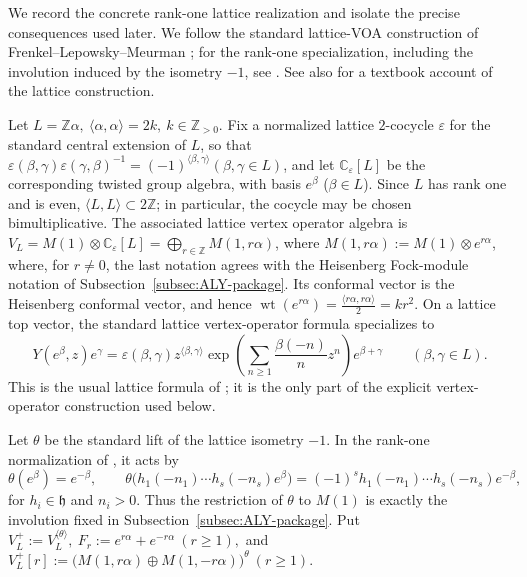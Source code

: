 \documentclass[10pt,a4paper]{amsart}
\numberwithin{equation}{section} \newtheorem{thm}{Theorem}[section] \newtheorem{lem}[thm]{Lemma} \newtheorem{ex}[thm]{Example} \newtheorem{prop}[thm]{Proposition} \newtheorem{cor}[thm]{Corollary} \newtheorem{defi}[thm]{Definition} \newtheorem{rmk}[thm]{Remark} \newtheorem{notation}[thm]{Notation}
\newcommand{\wt}{\operatorname{wt}}
\def\Z{\mathbb{Z}} \def\N{\mathbb{N}} \def\A{\mathbb{A}} \def\C{\mathbb{C}} \def\R{\mathbb{R}} \def\Q{\mathbb{Q}} \def\F{\mathbb{F}}
\begin{document}
We record the concrete rank-one lattice realization and isolate the precise consequences used later. We follow the standard lattice-VOA construction of Frenkel--Lepowsky--Meurman \cite[Chapter~8]{FLM}; for the rank-one specialization, including the involution induced by the isometry $-1$, see \cite[Section~2]{DG98}. See also \cite[Sections~6.4--6.5]{LepowskyLi} for a textbook account of the lattice construction.

Let \(L=\Z\alpha,\ \langle\alpha,\alpha\rangle=2k,\ k\in\Z_{>0}.\) Fix a normalized lattice $2$-cocycle $\varepsilon$ for the standard central extension of $L$, so that \(\varepsilon(\beta,\gamma)\varepsilon(\gamma,\beta)^{-1} =(-1)^{\langle\beta,\gamma\rangle} (\beta,\gamma\in L)\), and let $\C_\varepsilon[L]$ be the corresponding twisted group algebra, with basis $e^\beta$ ($\beta\in L$). Since $L$ has rank one and is even, $\langle L,L\rangle\subset 2\Z$; in particular, the cocycle may be chosen bimultiplicative. The associated lattice vertex operator algebra is \(V_L=M(1)\otimes\C_\varepsilon[L]=\bigoplus_{r\in\Z}M(1,r\alpha)\), where \(M(1,r\alpha):=M(1)\otimes e^{r\alpha}\), where, for $r\ne0$, the last notation agrees with the Heisenberg Fock-module notation of Subsection~\ref{subsec:ALY-package}. Its conformal vector is the Heisenberg conformal vector, and hence \(\wt(e^{r\alpha})=\frac{\langle r\alpha,r\alpha\rangle}{2}=kr^2.\) On a lattice top vector, the standard lattice vertex-operator formula specializes to
\begin{equation*}
Y(e^\beta,z)e^\gamma
=
\varepsilon(\beta,\gamma)
 z^{\langle\beta,\gamma\rangle}
 \exp\!\left(\sum_{n\ge1}\frac{\beta(-n)}{n}z^n\right)
 e^{\beta+\gamma}
\qquad(\beta,\gamma\in L).
\end{equation*}
This is the usual lattice formula of \cite[Chapter~8]{FLM}; it is the only part of the explicit vertex-operator construction used below.

Let $\theta$ be the standard lift of the lattice isometry $-1$. In the rank-one normalization of \cite[Section~2]{DG98}, it acts by
\[
\theta(e^\beta)=e^{-\beta},\qquad
\theta\bigl(h_1(-n_1)\cdots h_s(-n_s)e^\beta\bigr)
=(-1)^s h_1(-n_1)\cdots h_s(-n_s)e^{-\beta},
\]
for $h_i\in\mathfrak h$ and $n_i>0$. Thus the restriction of $\theta$ to $M(1)$ is exactly the involution fixed in Subsection~\ref{subsec:ALY-package}. Put \(V_L^+:=V_L^{\langle\theta\rangle},\ F_r:=e^{r\alpha}+e^{-r\alpha}\ (r\ge1),\) and \(V_L^+[r]:=\bigl(M(1,r\alpha)\oplus M(1,-r\alpha)\bigr)^\theta\ (r\ge1).\)
\end{document}
